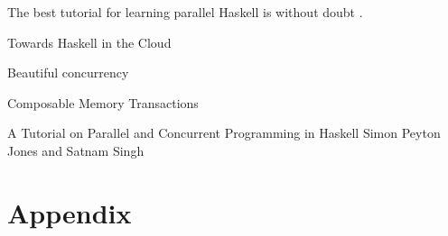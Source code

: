 \documentclass{bioinfo}
\begin{document}
The best tutorial for learning parallel Haskell is without doubt \cite{SPJTut}.

\begin{thebibliography}{}

Towards Haskell in the Cloud

Beautiful concurrency

Composable Memory Transactions

A Tutorial on Parallel and Concurrent
Programming in Haskell
Simon Peyton Jones and Satnam Singh


\end{thebibliography}

\section{Appendix}
\end{document}
